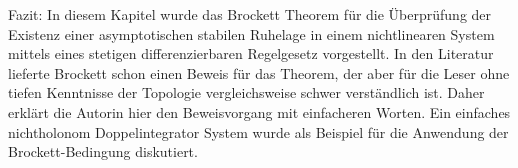 Fazit: In diesem Kapitel wurde das Brockett Theorem für die Überprüfung der Existenz einer asymptotischen stabilen Ruhelage in einem nichtlinearen System mittels eines stetigen differenzierbaren Regelgesetz vorgestellt. In den Literatur \cite{brockett1983asymptotic} lieferte Brockett schon einen Beweis für das Theorem, der aber für die Leser ohne tiefen Kenntnisse der Topologie  vergleichsweise schwer verständlich ist. Daher erklärt die Autorin hier den Beweisvorgang mit einfacheren Worten. Ein einfaches nichtholonom Doppelintegrator System wurde als Beispiel für die Anwendung der Brockett-Bedingung diskutiert.